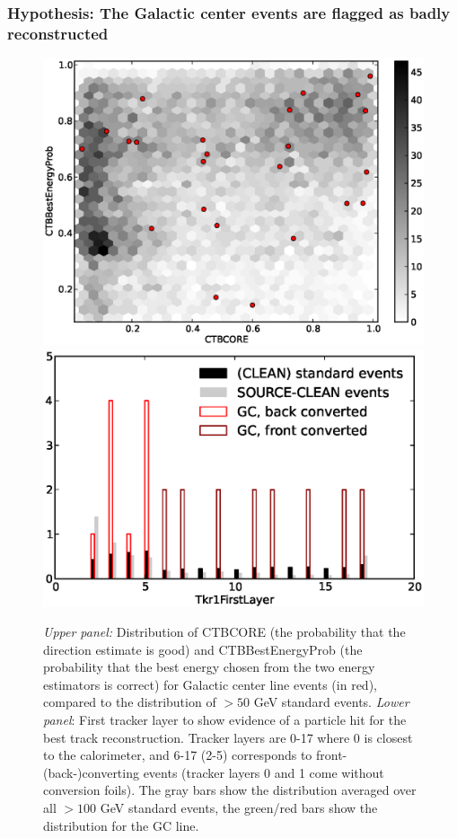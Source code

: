 \documentclass[aps,twocolumn,prd,superscriptaddress,showpacs,nofootinbib,fixfloat]{revtex4}
\begin{document}
\subsubsection{Hypothesis: The Galactic center events are flagged as badly
reconstructed}

\begin{figure}
  \centering
  \includegraphics[width=1.00\linewidth]{plots/CTBCORE_CTBBestEnergyProb.eps}
  \includegraphics[width=1.00\linewidth]{plots/Tkr1FirstLayer.eps}
  \caption{\emph{Upper panel:} Distribution of CTBCORE (the
  probability that the direction estimate is good) and
  CTBBestEnergyProb (the probability that the best energy
  chosen from the two energy estimators is correct) for
  Galactic center line events (in red), compared to the
  distribution of $>50$ GeV standard events.  \emph{Lower
  panel}: First tracker layer to show evidence of a particle
  hit for the best track reconstruction. Tracker layers are
  0-17 where 0 is closest to the calorimeter, and 6-17 (2-5)
  corresponds to front- (back-)converting events (tracker
  layers 0 and 1 come without conversion foils). The gray
  bars show the distribution averaged over all $>100$ GeV
  standard events, the green/red bars show the distribution
  for the GC line.}
  \label{fig:CTBquality}
\end{figure}
\end{document}
